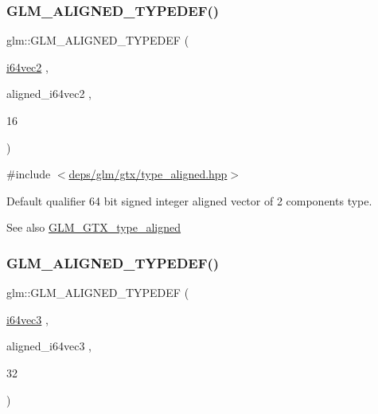 \subsubsection{\texorpdfstring{G\+L\+M\+\_\+\+A\+L\+I\+G\+N\+E\+D\+\_\+\+T\+Y\+P\+E\+D\+E\+F()}{GLM\_ALIGNED\_TYPEDEF()}\hspace{0.1cm}{\footnotesize\ttfamily [66/209]}}
{\footnotesize\ttfamily glm\+::\+G\+L\+M\+\_\+\+A\+L\+I\+G\+N\+E\+D\+\_\+\+T\+Y\+P\+E\+D\+EF (\begin{DoxyParamCaption}\item[{\hyperlink{group__gtc__type__precision_ga8654a1b3a6f81677f53eec13f8dd4224}{i64vec2}}]{,  }\item[{aligned\+\_\+i64vec2}]{,  }\item[{16}]{ }\end{DoxyParamCaption})}



{\ttfamily \#include $<$\hyperlink{gtx_2type__aligned_8hpp}{deps/glm/gtx/type\+\_\+aligned.\+hpp}$>$}

Default qualifier 64 bit signed integer aligned vector of 2 components type. \begin{DoxySeeAlso}{See also}
\hyperlink{group__gtx__type__aligned}{G\+L\+M\+\_\+\+G\+T\+X\+\_\+type\+\_\+aligned} 
\end{DoxySeeAlso}
\mbox{\label{group__gtx__type__aligned_gad77c317b7d942322cd5be4c8127b3187}} 
\subsubsection{\texorpdfstring{G\+L\+M\+\_\+\+A\+L\+I\+G\+N\+E\+D\+\_\+\+T\+Y\+P\+E\+D\+E\+F()}{GLM\_ALIGNED\_TYPEDEF()}\hspace{0.1cm}{\footnotesize\ttfamily [67/209]}}
{\footnotesize\ttfamily glm\+::\+G\+L\+M\+\_\+\+A\+L\+I\+G\+N\+E\+D\+\_\+\+T\+Y\+P\+E\+D\+EF (\begin{DoxyParamCaption}\item[{\hyperlink{group__gtc__type__precision_gad7aa290b2d88847999c1305ed5c82669}{i64vec3}}]{,  }\item[{aligned\+\_\+i64vec3}]{,  }\item[{32}]{ }\end{DoxyParamCaption})}



